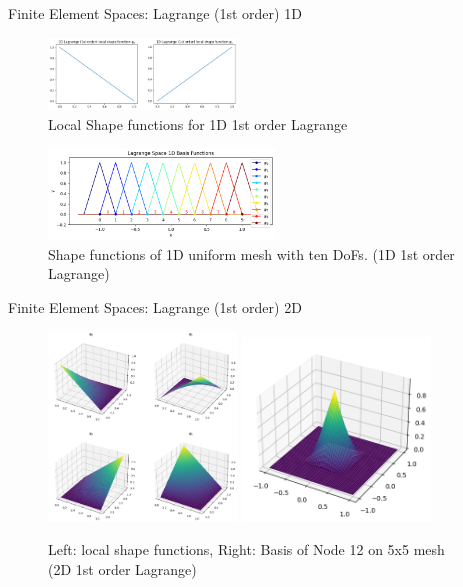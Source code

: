 \documentclass[handout,xcolor=pdftex,table,10pt,yellow,mathserif]{beamer}
\begin{document}
\begin{frame}{Finite Element Spaces: Lagrange (1st order) 1D}
    \begin{figure}
        \centering
        \includegraphics[width=5cm]{figures/lagrange_1st_basis_1d.png}    
        \caption{Local Shape functions for 1D 1st order Lagrange}
    \end{figure}

    \begin{figure}
        \centering
        \includegraphics[width=6cm]{figures/lagrange_1st_bases_1d.png}
        \caption{Shape functions of 1D uniform mesh with ten DoFs. (1D 1st order Lagrange)}
    \end{figure}
\end{frame}

\begin{frame}{Finite Element Spaces: Lagrange (1st order) 2D}
    \begin{figure}
        \centering
        \includegraphics[width=5cm]{figures/lagrange_1st_basis_2d.png}\hspace*{0.5cm}  
        \includegraphics[width=5cm]{figures/lagrange_1st_basis_2d_n12.png}
        \caption{Left: local shape functions, Right: Basis of Node 12 on 5x5 mesh (2D 1st order Lagrange)}
    \end{figure}
\end{frame}
\end{document}
